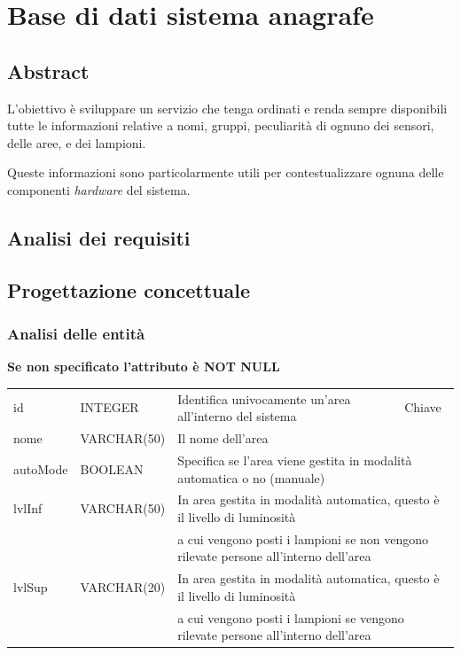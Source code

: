 \section{Base di dati sistema anagrafe}\label{sec:sbd-sistema-anagrafe}

\subsection{Abstract}

L'obiettivo è sviluppare un servizio che tenga ordinati e renda sempre disponibili tutte le informazioni relative a nomi, gruppi, peculiarità di ognuno dei sensori, delle aree, e dei lampioni. 

Queste informazioni sono particolarmente utili per contestualizzare ognuna delle componenti {\it{hardware}} del sistema.

\subsection{Analisi dei requisiti}

\subsection{Progettazione concettuale}

\subsubsection{Analisi delle entità}

\textbf{Se non specificato l'attributo è NOT NULL}

\begin{center}
    \begin{tabularx}{\textwidth}{|l|l|l|X|}
        \hline
        \rowcolor{gray!30}
        \multicolumn{4}{|c|}{\textbf{AREA}}\\
        \hline
        id & INTEGER & Identifica univocamente un'area all'interno del sistema & Chiave\\
        \hline
        nome & VARCHAR(50) & \multicolumn{2}{l|}{Il nome dell'area} \\
        \hline
        autoMode & BOOLEAN & \multicolumn{2}{l|}{Specifica se l'area viene gestita in modalità automatica o no (manuale)} \\
        \hline
        lvlInf & VARCHAR(50) & \multicolumn{2}{l|}{In area gestita in modalità automatica, questo è il livello di luminosità} \\ & & \multicolumn{2}{l|}{a cui vengono posti i lampioni se non vengono rilevate persone all'interno dell'area} \\
        \hline
        lvlSup & VARCHAR(20) & \multicolumn{2}{l|}{In area gestita in modalità automatica, questo è il livello di luminosità} \\ & & \multicolumn{2}{l|}{a cui vengono posti i lampioni se vengono rilevate persone all'interno dell'area} \\
        \hline
    \end{tabularx}
\end{center}

